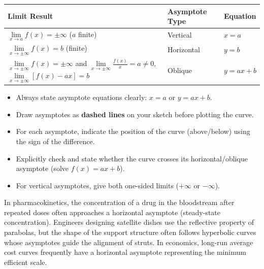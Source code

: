 \documentclass[11pt]{article}
\begin{document}
\begin{center}
\begin{tabularx}{\linewidth}{|l|X|X|}\hline
\rowcolor{popblueL}
\textbf{Limit Result} & \textbf{Asymptote Type} & \textbf{Equation} \\ \hline
$\lim\limits_{x\to a} f(x) = \pm\infty$ ($a$ finite) & Vertical & $x = a$ \\ \hline
$\lim\limits_{x\to \pm\infty} f(x) = b$ (finite) & Horizontal & $y = b$ \\ \hline
$\lim\limits_{x\to \pm\infty} f(x) = \pm\infty$ and $\lim\limits_{x\to \pm\infty} \frac{f(x)}{x} = a \neq 0$, $\lim\limits_{x\to \pm\infty} [f(x)-ax] = b$ & Oblique & $y = ax + b$ \\ \hline
\end{tabularx}
\end{center}

\begin{aretenir}
\begin{itemize}
\item Always state asymptote equations clearly: $x = a$ or $y = ax + b$.
\item Draw asymptotes as \textbf{dashed lines} on your sketch before plotting the curve.
\item For each asymptote, indicate the position of the curve (above/below) using the sign of the difference.
\item Explicitly check and state whether the curve crosses its horizontal/oblique asymptote (solve $f(x) = ax + b$).
\item For vertical asymptotes, give both one-sided limits ($+\infty$ or $-\infty$).
\end{itemize}
\end{aretenir}

\begin{savaistu}
In pharmacokinetics, the concentration of a drug in the bloodstream after repeated doses often approaches a horizontal asymptote (steady-state concentration). Engineers designing satellite dishes use the reflective property of parabolas, but the shape of the support structure often follows hyperbolic curves whose asymptotes guide the alignment of struts. In economics, long-run average cost curves frequently have a horizontal asymptote representing the minimum efficient scale.
\end{savaistu}
\end{document}
